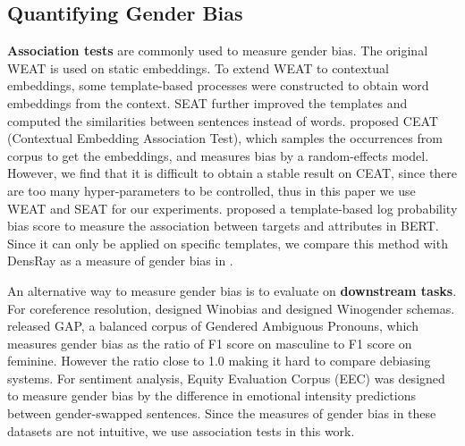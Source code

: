 \subsection{Quantifying Gender Bias}
\textbf{Association tests} are commonly used to measure
gender bias. The original WEAT is used on static
embeddings. To extend WEAT to contextual embeddings, some
template-based processes
\cite{karve2019conceptor,kurita2019measuring,Tan2019AssessingSA}
were constructed to obtain word embeddings from the
context. SEAT further improved the templates and computed
the similarities between sentences instead of
words.  proposed CEAT (Contextual
Embedding Association Test), which samples the occurrences
from corpus to get the embeddings, and measures bias
by a random-effects model. However, we find that it is
difficult to obtain a stable result on CEAT, since there are too many hyper-parameters to be controlled, thus in this paper we use WEAT and SEAT for our
experiments.  proposed a
template-based log probability bias score to measure the
association between targets and attributes in BERT. Since it
can only be applied on specific templates, we compare this
method with DensRay as a measure of gender bias in
.

An alternative way to measure gender bias is to evaluate on
\textbf{downstream tasks}. For coreference resolution,
 designed Winobias and
 designed Winogender
schemas.  released GAP, a balanced
corpus of Gendered Ambiguous Pronouns, which measures gender
bias as the ratio of F1 score on masculine to F1 score on
feminine. However the ratio close to 1.0 \cite{Chada_2019,Attree_2019} making it hard to compare debiasing systems. For sentiment analysis, Equity Evaluation
Corpus (EEC) \cite{Kiritchenko_2018} was designed to measure
gender bias by the difference in emotional intensity
predictions between gender-swapped sentences. Since the
measures of gender bias in these datasets are not
intuitive, we use association tests in
this work.


